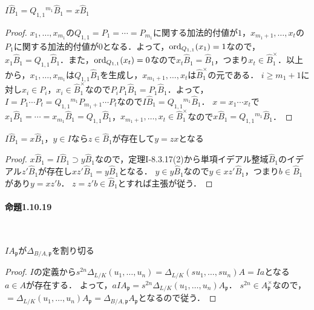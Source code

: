 \begin{screen}
  $I\widehat{B}_1=Q_{1,1}{}^{m_1}\widehat{B}_1=x\widehat{B}_1$
\end{screen}
\begin{proof}
  $x_1,\ldots,x_{m_1}$の$Q_{1,1}=P_1=\cdots=P_{m_1}$に関する加法的付値が$1$，$x_{m_1+1},\ldots,x_t$の$P_1$に関する加法的付値が$0$となる．よって，$\operatorname{ord}_{Q_{1,1}}(x_1)=1$なので，$x_1\widehat{B}_1=Q_{1,1}\widehat{B}_1$．また，$\operatorname{ord}_{Q_{1,1}}(x_t)=0$なので$x_t\widehat{B}_1=\widehat{B}_1$，つまり$x_t\in\widehat{B}_1^\times$．以上から，$x_1,\ldots,x_{m_1}$は$Q_{1,1}\widehat{B}_1$を生成し，$x_{m_1+1},\ldots,x_t$は$\widehat{B}_1^\times$の元である．
  $i\geq m_1+1$に対し$x_i \in P_i$，$x_i\in\widehat{B}_1^\times$なので$P_iP_1\widehat{B}_1=P_1\widehat{B}_1$．よって，$I=P_1\cdots P_t=Q_{1,1}{}^{m_1}P_{m_1+1}\cdots P_t$なので$I\widehat{B}_1=Q_{1,1}{}^{m_1}\widehat{B}_1$．
  $x=x_1\cdots x_t$で$x_1\widehat{B}_1=\cdots=x_{m_1}\widehat{B}_1=Q_{1,1}\widehat{B}_1$，$x_{m_1+1},\ldots,x_t\in\widehat{B}_1^\times$なので$x\widehat{B}_1=Q_{1,1}{}^{m_1}\widehat{B}_1$．
\end{proof}

\begin{screen}
  $I\widehat{B}_1=x\widehat{B}_1$，$y\in I$なら$z\in\widehat{B}_1$が存在して$y=zx$となる
\end{screen}
\begin{proof}
  $x\widehat{B}_1=I\widehat{B}_1\supset y\widehat{B}_1$なので，定理I-8.3.17(2)から単項イデアル整域$\widehat{B}_1$のイデアル$z'\widehat{B}_1$が存在し$xz'\widehat{B}_1=y\widehat{B}_1$となる．
  $y\in y\widehat{B}_1$なので$y\in xz'\widehat{B}_1$，つまり$b\in\widehat{B}_1$があり$y=xz'b$．
  $z=z'b\in\widehat{B}_1$とすれば主張が従う．
\end{proof}

\paragraph{命題1.10.19}~
\begin{screen}
  $IA_\mathfrak{p}$が$\varDelta_{B/A,\mathfrak{p}}$を割り切る
\end{screen}
\begin{proof}
  $I$の定義から$s^{2n}\varDelta_{L/K}(u_1,\ldots,u_n)=\varDelta_{L/K}(su_1,\ldots,su_n)A=Ia$となる$a\in A$が存在する．
  よって，$aIA_\mathfrak{p}=s^{2n}\varDelta_{L/K}(u_1,\ldots,u_n)A_\mathfrak{p}$．
  $s^{2n}\in A_\mathfrak{p}^\times$なので，$=\varDelta_{L/K}(u_1,\ldots,u_n)A_\mathfrak{p}=\varDelta_{B/A,\mathfrak{p}}A_\mathfrak{p}$となるので従う．
\end{proof}

